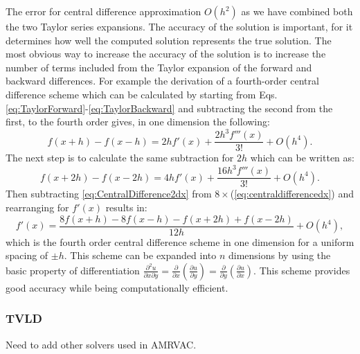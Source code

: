 \documentclass[12pt,a4paper,twoside]{article}
\begin{document}
The  error for central difference approximation $O(h^{2})$ as we have combined both the two Taylor series expansions. The accuracy of the solution is important, for it determines how well the computed solution represents the true solution. The most obvious way to increase the accuracy of the solution is to increase the number of terms included from the Taylor expansion of the forward and backward differences. For example the derivation of a fourth-order central difference scheme which can be calculated by starting from Eqs. \eqref{eq:TaylorForward}-\eqref{eq:TaylorBackward} and subtracting the second from the first, to the fourth order gives, in one dimension the following:
\begin{equation}
f(x+h)-f(x-h)=2 h f'(x)+\frac{2 h^{3} f'''(x)}{3!}+O(h^{4}).\label{eq:centraldifferencedx}
\end{equation}
The next step is to calculate the same subtraction for $2 h$ which can be written as:
\begin{equation}
f(x+2 h)-f(x-2 h)=4 h f'(x)+\frac{16 h^{3}f'''(x)}{3!}+O(h^{4}).\label{eq:CentralDifference2dx}
\end{equation}
Then subtracting \eqref{eq:CentralDifference2dx} from $8\times$(\eqref{eq:centraldifferencedx}) and rearranging for $f'(x)$ results in:
\begin{equation}
f'(x)=\frac{8f(x+h)-8f(x-h)-f(x+2h)+f(x-2h)}{12h}+O(h^{4}),\label{eq:4thOrderCentralDifferenceUniform}
\end{equation}
which is the fourth order central difference scheme in one dimension for a uniform spacing of $\pm h$.
This scheme can be expanded into $n$ dimensions by using the basic property of differentiation $\frac{\partial^{2}u}{\partial x\partial y}=\frac{\partial}{\partial x}\left(\frac{\partial u}{\partial y}\right)=\frac{\partial}{\partial y}\left(\frac{\partial u}{\partial x}\right)$. This scheme provides good accuracy while being computationally efficient.
\subsubsection{TVLD}
Need to add other solvers used in AMRVAC.
\end{document}
